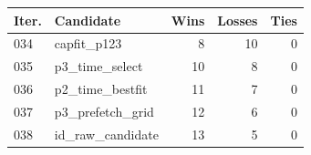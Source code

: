 \begin{tabular}{llrrr}
\toprule
Iter. & Candidate & Wins & Losses & Ties \\
\midrule
034 & capfit\_p123 & 8 & 10 & 0 \\
035 & p3\_time\_select & 10 & 8 & 0 \\
036 & p2\_time\_bestfit & 11 & 7 & 0 \\
037 & p3\_prefetch\_grid & 12 & 6 & 0 \\
038 & id\_raw\_candidate & 13 & 5 & 0 \\
\bottomrule
\end{tabular}

